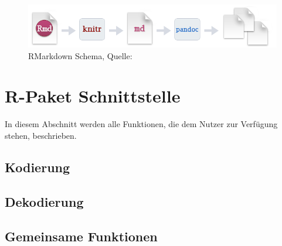 \begin{figure}[ht]
\centering
\includegraphics[width=\ScaleIfNeeded]{pictures/RMarkdown}
\caption{RMarkdown Schema, Quelle: \cite{rmarkdown}}
\label{pic:RMarkdown}
\end{figure}




\section{R-Paket Schnittstelle}
\label{section:interface}

In diesem Abschnitt werden alle Funktionen, die dem Nutzer zur Verfügung stehen, beschrieben.

\subsection{Kodierung}

\label{sec:interface_genHamming}


\label{sec:interface_genBCH}


\label{sec:interface_encode}


\subsection{Dekodierung}

\label{sec:interface_decode}


\label{sec:interface_simulation}



\subsection{Gemeinsame Funktionen}
\label{sec:interface_applynoise}


\label{sec:interface_channelsimulation}


\label{sec:interface_plotdata}




